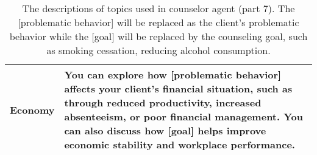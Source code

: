 \begin{table*}[tb]
\begin{tabularx}{\textwidth}{lX}
Economy                     & You can explore how [problematic behavior] affects your client's financial situation, such as through reduced productivity, increased absenteeism, or poor financial management. You can also discuss how [goal] helps improve economic stability and workplace performance.                                                                                                                                                      
\\ \bottomrule
\end{tabularx}
\caption{The descriptions of topics used in counselor agent (part 7). The [problematic behavior] will be replaced as the client's problematic behavior while the [goal] will be replaced by the counseling goal, such as smoking cessation, reducing alcohol consumption.}
\label{tab:counselor topic description 7}
\end{table*}   

